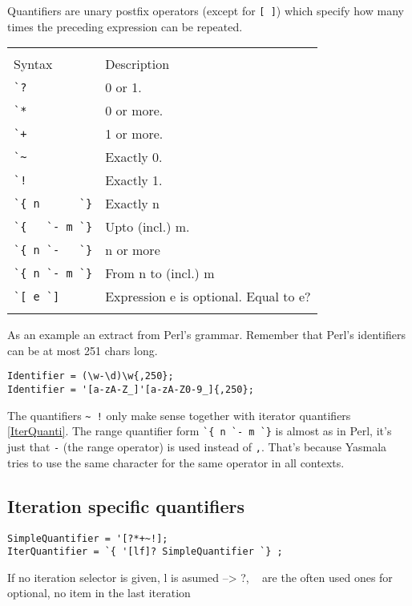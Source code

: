 \documentclass[a4paper]{report}
\begin{document}
Quantifiers are unary postfix operators (except for \verb|[ ]|) which specify
how many times the preceding expression can be repeated. 

\begin{tabular}{p{2cm}p{9.5cm}}
  & \\
Syntax   & Description \\
\verb|`?| & 0 or 1.\\
\verb|`*| & 0 or more.\\
\verb|`+| & 1 or more.\\
\verb|`~| & Exactly 0.\\
\verb|`!| & Exactly 1.\\
\verb|`{ n      `}| & Exactly n \\
\verb|`{   `- m `}| & Upto (incl.) m. \\
\verb|`{ n `-   `}| & n or more \\
\verb|`{ n `- m `}| & From n to (incl.) m\\
\verb|`[ e `]| & Expression e is optional. Equal to e?\\
  & \\
\end{tabular}

As an example an extract from Perl's grammar. Remember that Perl's identifiers
can be at most 251 chars long.

\begin{verbatim}
Identifier = (\w-\d)\w{,250};
Identifier = '[a-zA-Z_]'[a-zA-Z0-9_]{,250};
\end{verbatim}  

The quantifiers \verb|~ !| only make sense together with iterator quantifiers
\ref{IterQuanti}. The range quantifier form \verb|`{ n `- m `}| is almost as in
Perl, it's just that \verb|-| (the range operator) is used instead of \verb|,|.
That's because Yasmala tries to use the same character for the same operator in
all contexts. 

\label{IterQuanti}
\subsection{Iteration specific quantifiers}
  
\begin{verbatim}
SimpleQuantifier = '[?*+~!];
IterQuantifier = `{ '[lf]? SimpleQuantifier `} ;  
\end{verbatim}

If no iteration selector is given, l is asumed --> {?}, {~} are the
often used ones for optional, no item in the last iteration
\end{document}
